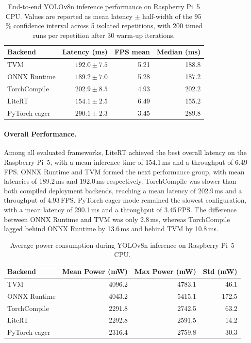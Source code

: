 \documentclass[12pt,a4paper]{report}
\begin{document}
\begin{table}[ht]
\centering
\caption{End-to-end YOLOv8n inference performance on Raspberry Pi~5 CPU.
Values are reported as mean latency $\pm$ half-width of the 95\,\% confidence
interval across 5 isolated repetitions, with 200 timed runs per repetition
after 30 warm-up iterations.}
\label{tab:pi5_backend_benchmark}
\begin{tabular}{lrrr}
\toprule
Backend & Latency (ms) & FPS mean & Median (ms) \\
\midrule
TVM             & $192.0 \pm 7.5$ & 5.21 & 188.8 \\
ONNX Runtime    & $189.2 \pm 7.0$ & 5.28 & 187.2 \\
TorchCompile    & $202.9 \pm 8.5$ & 4.93 & 202.2 \\
LiteRT          & $154.1 \pm 2.5$ & 6.49 & 155.2 \\
PyTorch eager   & $290.1 \pm 2.3$ & 3.45 & 289.8 \\
\bottomrule
\end{tabular}
\end{table}

\paragraph{Overall Performance.}
Among all evaluated frameworks, LiteRT achieved the best overall latency on the
Raspberry Pi~5, with a mean inference time of 154.1\,ms and a throughput of
6.49\,FPS. ONNX Runtime and TVM formed the next performance group, with mean
latencies of 189.2\,ms and 192.0\,ms respectively. TorchCompile was slower than
both compiled deployment backends, reaching a mean latency of 202.9\,ms and a
throughput of 4.93\,FPS. PyTorch eager mode remained the slowest configuration,
with a mean latency of 290.1\,ms and a throughput of 3.45\,FPS. The difference
between ONNX Runtime and TVM was only 2.8\,ms, whereas TorchCompile lagged
behind ONNX Runtime by 13.6\,ms and behind TVM by 10.8\,ms.

\begin{table}[ht]
\centering
\caption{Average power consumption during YOLOv8n inference on Raspberry Pi~5 CPU.}
\label{tab:pi5_backend_power}
\begin{tabular}{lrrr}
\toprule
Backend & Mean Power (mW) & Max Power (mW) & Std (mW) \\
\midrule
TVM             & 4096.2 & 4783.1 & 46.1 \\
ONNX Runtime    & 4043.2 & 5415.1 & 172.5 \\
TorchCompile    & 2291.8 & 2742.5 & 63.2 \\
LiteRT          & 2292.8 & 2591.5 & 14.2 \\
PyTorch eager   & 2316.4 & 2759.8 & 30.3 \\
\bottomrule
\end{tabular}
\end{table}
\end{document}
